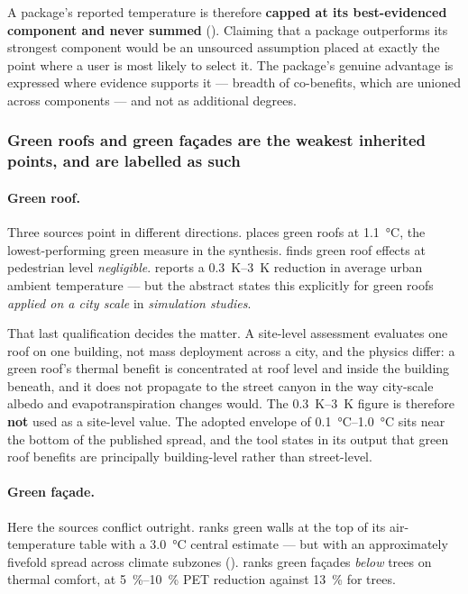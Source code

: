 A package's reported temperature is therefore \textbf{capped at its
best-evidenced component and never summed} (). Claiming that
a package outperforms its strongest component would be an unsourced assumption
placed at exactly the point where a user is most likely to select it. The
package's genuine advantage is expressed where evidence supports it --- breadth
of co-benefits, which are unioned across components --- and not as additional
degrees.

\subsubsection{Green roofs and green fa\c{c}ades are the weakest inherited
points, and are labelled as such}
\label{sec:weak-points}

\paragraph{Green roof.} Three sources point in different directions.
\textcite{keravec2026} places green roofs at \qty{1.1}{\degreeCelsius}, the
lowest-performing green measure in the synthesis. \textcite{zolch2016} finds
green roof effects at pedestrian level \emph{negligible}.
\textcite{santamouris2014} reports a \SIrange{0.3}{3}{\kelvin} reduction in
average urban ambient temperature --- but the abstract states this explicitly
for green roofs \emph{applied on a city scale} in \emph{simulation studies}.

That last qualification decides the matter. A site-level assessment evaluates
one roof on one building, not mass deployment across a city, and the physics
differ: a green roof's thermal benefit is concentrated at roof level and inside
the building beneath, and it does not propagate to the street canyon in the way
city-scale albedo and evapotranspiration changes would. The
\SIrange{0.3}{3}{\kelvin} figure is therefore \textbf{not} used as a site-level
value. The adopted envelope of
\SIrange{0.1}{1.0}{\degreeCelsius} sits near the bottom of the published
spread, and the tool states in its output that green roof benefits are
principally building-level rather than street-level.

\paragraph{Green fa\c{c}ade.} Here the sources conflict outright.
\textcite{keravec2026} ranks green walls at the top of its air-temperature
table with a \qty{3.0}{\degreeCelsius} central estimate --- but with an
approximately fivefold spread across climate subzones
(). \textcite{zolch2016} ranks green fa\c{c}ades
\emph{below} trees on thermal comfort, at \SIrange{5}{10}{\percent} PET
reduction against \SI{13}{\percent} for trees.

